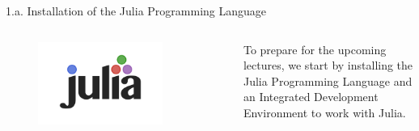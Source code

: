 \documentclass[aspectratio=1610,12pt]{beamer}
\begin{document}
\begin{frame}[fragile]{1.a. Installation of the Julia Programming Language}
\label{pic_julia}
	\begin{columns}[onlytextwidth]
    	\center
    		\begin{figure}
    			\includegraphics[width=0.8\textwidth]{images/julia-programming-language.png}
       		\end{figure}
    		To prepare for the upcoming lectures, we start by installing the Julia Programming Language and an Integrated Development Environment to work with Julia.
    \end{columns}
\end{frame}
\end{document}
